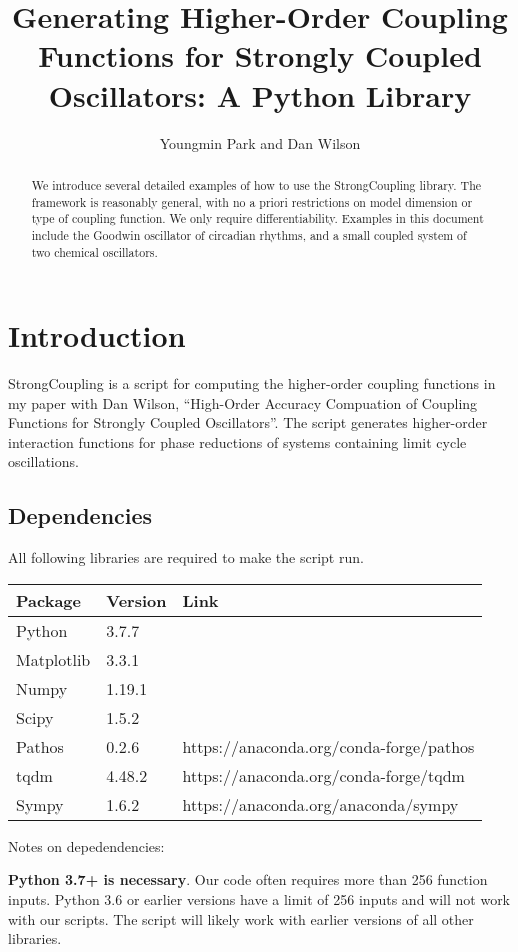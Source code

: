 \documentclass[english,a4paper,oneside]{article}
\title{Generating Higher-Order Coupling Functions for Strongly Coupled
Oscillators: A Python Library}
\author{Youngmin Park and Dan Wilson}
\date{}
\begin{document}
\maketitle
\begin{abstract}
We introduce several detailed examples of how to use the StrongCoupling
library. The framework is reasonably general, with no a priori
restrictions on model dimension or type of coupling function. We only
require differentiability. Examples in this document include the Goodwin
oscillator of circadian rhythms, and a small coupled system of two
chemical oscillators.
\end{abstract}

{
\hypersetup{linkcolor=}
\setcounter{tocdepth}{4}
\tableofcontents
}
\hypertarget{introduction}{%
\section{Introduction}\label{introduction}}

StrongCoupling is a script for computing the higher-order coupling
functions in my paper with Dan Wilson, ``High-Order Accuracy Compuation
of Coupling Functions for Strongly Coupled Oscillators''. The script
generates higher-order interaction functions for phase reductions of
systems containing limit cycle oscillations.

\hypertarget{dependencies}{%
\subsection{Dependencies}\label{dependencies}}

All following libraries are required to make the script run.

\begin{longtable}[]{@{}lll@{}}
\toprule
Package & Version & Link\tabularnewline
\midrule
\endhead
Python & 3.7.7 &\tabularnewline
Matplotlib & 3.3.1 &\tabularnewline
Numpy & 1.19.1 &\tabularnewline
Scipy & 1.5.2 &\tabularnewline
Pathos & 0.2.6 & https://anaconda.org/conda-forge/pathos\tabularnewline
tqdm & 4.48.2 & https://anaconda.org/conda-forge/tqdm\tabularnewline
Sympy & 1.6.2 & https://anaconda.org/anaconda/sympy\tabularnewline
\bottomrule
\end{longtable}

Notes on depedendencies:

\textbf{Python 3.7+ is necessary}. Our code often requires more than 256
function inputs. Python 3.6 or earlier versions have a limit of 256
inputs and will not work with our scripts. The script will likely work
with earlier versions of all other libraries.
\end{document}
